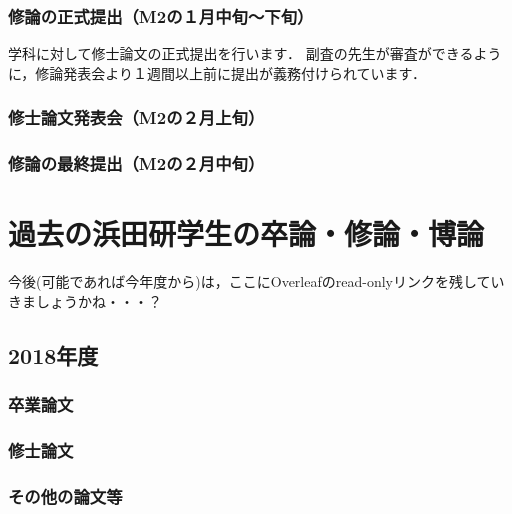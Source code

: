 \documentclass[dvipdfmx,autodetect-engine]{jsreport}
\begin{document}
\subsection{修論の正式提出（M2の１月中旬〜下旬）}

学科に対して修士論文の正式提出を行います．
副査の先生が審査ができるように，修論発表会より１週間以上前に提出が義務付けられています．


\subsection{修士論文発表会（M2の２月上旬）}

\subsection{修論の最終提出（M2の２月中旬）}

\chapter{過去の浜田研学生の卒論・修論・博論}\label{chap:past_thesis}

今後(可能であれば今年度から)は，ここにOverleafのread-onlyリンクを残していきましょうかね・・・？

\section{2018年度}

\subsection{卒業論文}

\subsection{修士論文}

\subsection{その他の論文等}
\end{document}
